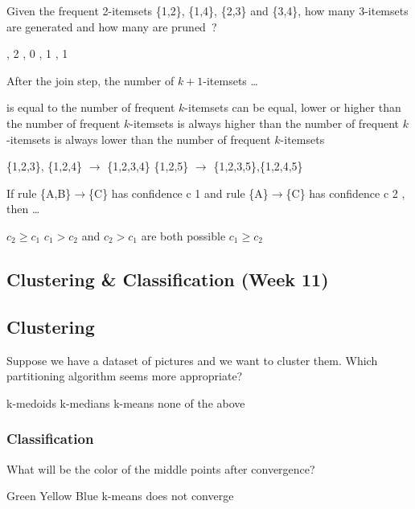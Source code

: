\documentclass[12pt,a4paper]{exam} %
\begin{document}
\begin{flushleft}
\begin{multicols*}{2}
\begin{questions}
\question Given the frequent 2-itemsets \{1,2\}, \{1,4\}, \{2,3\} and \{3,4\}, how many 3-itemsets are generated and how many are pruned~?
\begin{checkboxes}
, 2
, 0
, 1
, 1
\end{checkboxes}

\question After the join step, the number of $k+1$-itemsets \ldots
\begin{checkboxes}
\choice is equal to the number of frequent $k$-itemsets
\CorrectChoice can be equal, lower or higher than the number of frequent $k$-itemsets
\choice is always higher than the number of frequent $k$-itemsets
\choice is always lower than the number of frequent $k$-itemsets
\end{checkboxes}
\begin{solution}
\{1,2,3\}, \{1,2,4\} $\rightarrow$ \{1,2,3,4\}
\{1,2,5\} $\rightarrow$ \{1,2,3,5\},\{1,2,4,5\}
\end{solution}

\question If rule \{A,B\}$\rightarrow$\{C\} has confidence c 1 and rule \{A\}$\rightarrow$\{C\} has confidence c 2 , then \ldots
\begin{checkboxes}
\CorrectChoice $c_2 \geq c_1$
\choice $c_1 > c_2$ and $c_2 > c_1$ are both possible
\choice $c_1 \geq c_2$
\end{checkboxes}


\subsection{Clustering \& Classification (Week 11)}
\subsection{Clustering}
\question Suppose we have a dataset of pictures and we want to cluster them. Which partitioning algorithm seems more appropriate?
\begin{checkboxes}
\choice k-medoids
\choice k-medians
\choice k-means
\choice none of the above
\end{checkboxes}

\subsubsection{Classification}
% 
\question What will be the color of the middle points after convergence?
\begin{checkboxes}
\choice Green
\choice Yellow
\choice Blue
\choice k-means does not converge
\end{checkboxes}


\end{questions}
\end{multicols*}
\end{flushleft}
\end{document}

